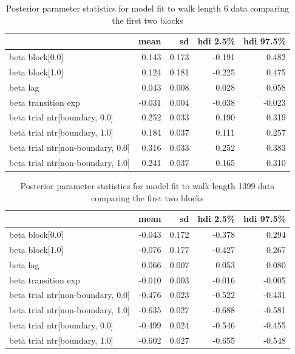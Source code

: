 \begin{table}[H]
    \centering
    \begin{tabular}{lrrrr}
        \toprule
         & mean & sd & hdi 2.5\% & hdi 97.5\% \\
        \midrule
        beta block[0.0] & 0.143 & 0.173 & -0.191 & 0.482 \\
        beta block[1.0] & 0.124 & 0.181 & -0.225 & 0.475 \\
        beta lag & 0.043 & 0.008 & 0.028 & 0.058 \\
        beta transition exp & -0.031 & 0.004 & -0.038 & -0.023 \\
        beta trial ntr[boundary, 0.0] & 0.252 & 0.033 & 0.190 & 0.319 \\
        beta trial ntr[boundary, 1.0] & 0.184 & 0.037 & 0.111 & 0.257 \\
        beta trial ntr[non-boundary, 0.0] & 0.316 & 0.033 & 0.252 & 0.383 \\
        beta trial ntr[non-boundary, 1.0] & 0.241 & 0.037 & 0.165 & 0.310 \\
        \bottomrule
    \end{tabular}
    \caption{Posterior parameter statistics for model fit to walk length 6 data comparing the first two blocks}
    \label{tab:first-two-blocks-6}
\end{table}

\begin{table}[H]
    \centering
    \begin{tabular}{lrrrr}
        \toprule
         & mean & sd & hdi 2.5\% & hdi 97.5\% \\
        \midrule
        beta block[0.0] & -0.043 & 0.172 & -0.378 & 0.294 \\
        beta block[1.0] & -0.076 & 0.177 & -0.427 & 0.267 \\
        beta lag & 0.066 & 0.007 & 0.053 & 0.080 \\
        beta transition exp & -0.010 & 0.003 & -0.016 & -0.005 \\
        beta trial ntr[non-boundary, 0.0] & -0.476 & 0.023 & -0.522 & -0.431 \\
        beta trial ntr[non-boundary, 1.0] & -0.635 & 0.027 & -0.688 & -0.581 \\
        beta trial ntr[boundary, 0.0] & -0.499 & 0.024 & -0.546 & -0.455 \\
        beta trial ntr[boundary, 1.0] & -0.602 & 0.027 & -0.655 & -0.548 \\
        \bottomrule
        \end{tabular}   
        \caption{Posterior parameter statistics for model fit to walk length 1399 data comparing the first two blocks}
        \label{tab:first-two-blocks-1399}    
\end{table}

